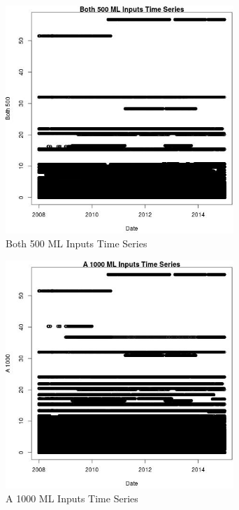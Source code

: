\begin{figure} 
\centering  
\includegraphics[width=0.77\textwidth]{Code_Outputs/ML_input_report_ML_input_PM25_Step5_part_d_de_duplicated_aves_ML_input_Both_500vDate.jpg} 
\caption{\label{fig:ML_input_report_ML_input_PM25_Step5_part_d_de_duplicated_aves_ML_inputBoth_500vDate}Both 500 ML Inputs Time Series} 
\end{figure} 
 

\begin{figure} 
\centering  
\includegraphics[width=0.77\textwidth]{Code_Outputs/ML_input_report_ML_input_PM25_Step5_part_d_de_duplicated_aves_ML_input_A_1000vDate.jpg} 
\caption{\label{fig:ML_input_report_ML_input_PM25_Step5_part_d_de_duplicated_aves_ML_inputA_1000vDate}A 1000 ML Inputs Time Series} 
\end{figure} 
 

